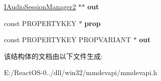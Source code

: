 \begin{DoxyCompactItemize}
\item 
\mbox{\label{struct___driver_funcs_a5f45188d3bcba485f12511df40cbc110}} 
\hyperlink{interface_i_audio_session_manager2}{I\+Audio\+Session\+Manager2} $\ast$$\ast$ {\bfseries out}
\item 
\mbox{\label{struct___driver_funcs_a4c99aac67a0ec4a7825e5c5d320fadd1}} 
const P\+R\+O\+P\+E\+R\+T\+Y\+K\+EY $\ast$ {\bfseries prop}
\item 
\mbox{\label{struct___driver_funcs_a3f9432079f7a20853cac43933f93454d}} 
const P\+R\+O\+P\+E\+R\+T\+Y\+K\+EY P\+R\+O\+P\+V\+A\+R\+I\+A\+NT $\ast$ {\bfseries out}
\end{DoxyCompactItemize}


该结构体的文档由以下文件生成\+:\begin{DoxyCompactItemize}
\item 
E\+:/\+React\+O\+S-\/0../dll/win32/mmdevapi/mmdevapi.\+h\end{DoxyCompactItemize}
